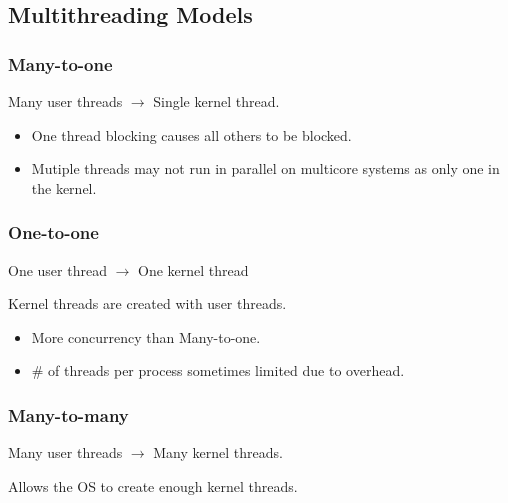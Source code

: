 \subsection{Multithreading Models}

\subsubsection{Many-to-one}

Many user threads $\to$ Single kernel thread.

\begin{itemize}
    \item One thread blocking causes all others to be blocked.
    \item Mutiple threads may not run in parallel on multicore systems as only one in the kernel.
\end{itemize}


\subsubsection{One-to-one}

One user thread $\to$ One kernel thread

Kernel threads are created with user threads.

\begin{itemize}
    \item More concurrency than Many-to-one.
    \item \# of threads per process sometimes limited due to overhead.
\end{itemize}


\subsubsection{Many-to-many}

Many user threads $\to$ Many kernel threads.

Allows the OS to create enough kernel threads.